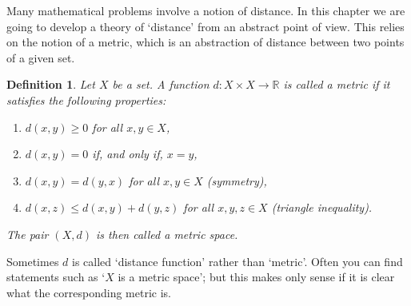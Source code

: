 \documentclass[a4paper,reqno]{amsart}
\numberwithin{equation}{section}
\newtheorem{definition}{Definition}[section]
\def\R{\mathbb{R}}
\begin{document}

Many mathematical problems involve a notion of distance. In this chapter we
are going to develop a theory of `distance' from an abstract point of view. This relies
on the notion of a metric, which is an abstraction of distance between two
points of a given set.

\begin{definition}
Let $X$ be a set. A function $d : X \times X \to \R$ is called
a \emph{metric} if it satisfies the following properties:
\begin{enumerate}
\item \label{def:non-negative} $d(x,y) \ge 0$ for all $x,y \in X$,
\item \label{def:positive} $d(x,y) = 0$ if, and only if, $x = y$,
\item \label{def:symmetry} $d(x,y) = d(y,x)$ for all $x,y \in X$ (symmetry),
\item \label{def:triangle} $d(x,z) \le d(x,y) + d(y,z)$ for all $x,y,z \in X$ (triangle inequality).
\end{enumerate}
The pair $(X,d)$ is then called a \emph{metric space}.
\end{definition}

Sometimes $d$ is called `distance function' rather than `metric'. Often you can
find statements such as `$X$ is a metric space'; but this makes only sense if
it is clear what the corresponding metric is.
\end{document}
